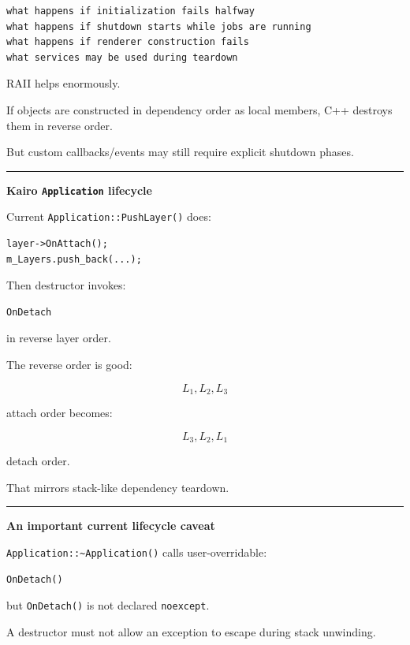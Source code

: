 \begin{verbatim}
what happens if initialization fails halfway
what happens if shutdown starts while jobs are running
what happens if renderer construction fails
what services may be used during teardown
\end{verbatim}

RAII helps enormously.

If objects are constructed in dependency order as local members, C++ destroys them in reverse order.

But custom callbacks/events may still require explicit shutdown phases.

\begin{center}\rule{0.5\linewidth}{0.5pt}\end{center}

\textbf{Kairo \texttt{Application} lifecycle}

Current \texttt{Application::PushLayer()} does:

\begin{verbatim}
layer->OnAttach();
m_Layers.push_back(...);
\end{verbatim}

Then destructor invokes:

\begin{verbatim}
OnDetach
\end{verbatim}

in reverse layer order.

The reverse order is good:

\[
L_1,L_2,L_3
\]

attach order becomes:

\[
L_3,L_2,L_1
\]

detach order.

That mirrors stack-like dependency teardown.

\begin{center}\rule{0.5\linewidth}{0.5pt}\end{center}

\textbf{An important current lifecycle caveat}

\texttt{Application::\textasciitilde{}Application()} calls user-overridable:

\begin{verbatim}
OnDetach()
\end{verbatim}

but \texttt{OnDetach()} is not declared \texttt{noexcept}.

A destructor must not allow an exception to escape during stack unwinding.

